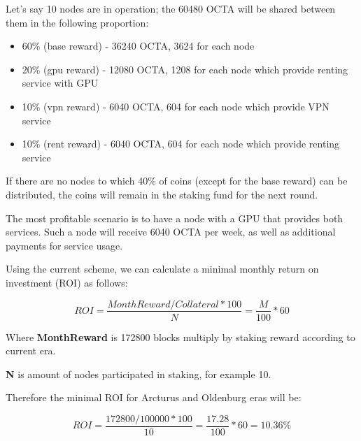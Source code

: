 Let's say 10 nodes are in operation; the 60480 OCTA will be shared between them in the following proportion:

\begin{itemize}
    \item 60\% (base reward) - 36240 OCTA, 3624 for each node
    \item 20\% (gpu reward) - 12080 OCTA, 1208 for each node which provide renting service with GPU
    \item 10\% (vpn reward) - 6040 OCTA, 604 for each node which provide VPN service
    \item 10\% (rent reward) - 6040 OCTA, 604 for each node which provide renting service
\end{itemize}

If there are no nodes to which 40\% of coins (except for the base reward) can be distributed, the coins will remain in the staking fund for the next round.

The most profitable scenario is to have a node with a GPU that provides both services. Such a node will receive 6040 OCTA per week, as well as additional payments for service usage.

Using the current scheme, we can calculate a minimal monthly return on investment (ROI) as follows:

\[
    ROI = \frac{MonthReward / Collateral * 100}{N} = \frac{M}{100} * 60
\]

Where \textbf{MonthReward} is 172800 blocks multiply by staking reward according to current era.

\textbf{N} is amount of nodes participated in staking, for example 10.

Therefore the minimal ROI for Arcturus and Oldenburg eras will be:

\[
    ROI = \frac{172800 / 100000 * 100}{10} = \frac{17.28}{100} * 60 = 10.36\%
\]
